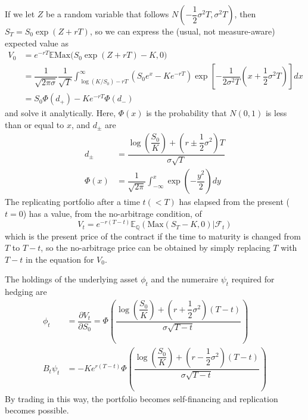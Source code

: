 \documentclass[uplatex,a4j,12pt,dvipdfmx]{jsarticle}
\begin{document}
If we let $Z$ be a random variable that follows $N \left( - \dfrac{1}{2} \sigma^{2} T , \sigma^{2} T \right)$, then $S_{T} = S_{0} \exp ( Z + rT )$, so we can express the (usual, not measure-aware) expected value as
\begin{align*}
	V_{0} & = e^{-rT} \mathbb{E} \mathrm{Max} \Big( S_{0} \exp ( Z + rT ) - K , 0 \Big) \\
	& = \dfrac{1}{\sqrt{2 \pi \sigma}} \dfrac{1}{\sqrt{T}} \int^{\infty}_{\log(K/S_{0}) - rT} \left( S_{0} e^{x} - K e^{-rT} \right) \exp \left[ - \dfrac{1}{2 \sigma^{2} T} \left( x + \dfrac{1}{2} \sigma^{2} T \right) \right] dx \\
	& = S_{0} \Phi(d_{+}) - K e^{-rT} \Phi(d_{-})
\end{align*}
and solve it analytically.
Here, $\Phi(x)$ is the probability that $N(0,1)$ is less than or equal to $x$, and $d_{\pm}$ are
\begin{align*}
	d_{\pm} & = \dfrac{ \log \left( \dfrac{S_{0}}{K} \right) + \left( r \pm \dfrac{1}{2} \sigma^{2} \right) T }{ \sigma \sqrt{T} } \\
	\Phi(x) & = \dfrac{1}{\sqrt{2\pi}} \int^{x}_{- \infty} \exp \left( -\dfrac{y^{2}}{2} \right) dy
\end{align*}
The replicating portfolio after a time $t(<T)$ has elapsed from the present ($t=0$) has a value, from the no-arbitrage condition, of
$$V_{t} = e^{-r(T-t)} \mathbb{E}_{\mathbb{Q}} \left( \mathrm{Max}(S_{T} - K,0) \Big| \mathcal{F}_{t} \right)$$
which is the present price of the contract if the time to maturity is changed from $T$ to $T-t$, so the no-arbitrage price can be obtained by simply replacing $T$ with $T-t$ in the equation for $V_{0}$.

The holdings of the underlying asset $\phi_{t}$ and the numeraire $\psi_{t}$ required for hedging are
\begin{align*}
	\phi_{t} & = \dfrac{\partial V_{t}}{\partial S_{0}} = \Phi \left( \dfrac{ \log \left( \dfrac{S_{0}}{K} \right) + \left( r + \dfrac{1}{2} \sigma^{2} \right) (T-t) }{ \sigma \sqrt{T-t} } \right) \\
	B_{t} \psi_{t} & = - K e^{r(T-t)} \Phi \left( \dfrac{ \log \left( \dfrac{S_{0}}{K} \right) + \left( r - \dfrac{1}{2} \sigma^{2} \right) (T-t) }{ \sigma \sqrt{T-t} } \right)
\end{align*}
By trading in this way, the portfolio becomes self-financing and replication becomes possible.
\end{document}
